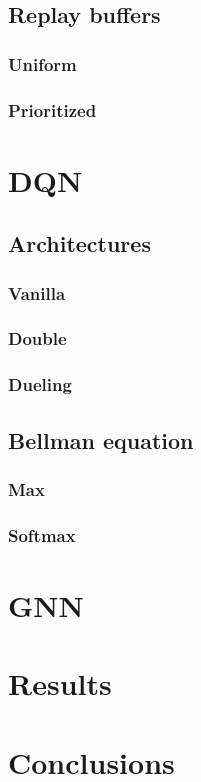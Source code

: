 \documentclass[a4paper,10pt]{report}
\begin{document}
\section{Replay buffers}
\subsection{Uniform}
\subsection{Prioritized}

\chapter{DQN}
\section{Architectures}
\subsection{Vanilla}
\subsection{Double}
\subsection{Dueling}
\section{Bellman equation}
\subsection{Max}
\subsection{Softmax}

\chapter{GNN}

\chapter{Results}



\chapter{Conclusions}

\printbibliography
\end{document}
